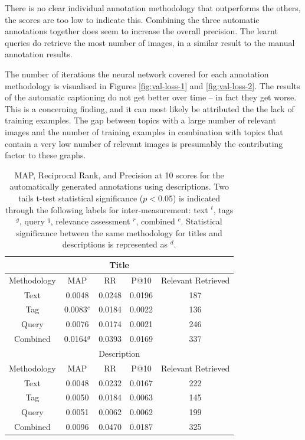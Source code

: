 There is no clear individual annotation methodology that outperforms the others, the scores are too low to indicate this. Combining the three automatic annotations together does seem to increase the overall precision. The learnt queries do retrieve the most number of images, in a similar result to the manual annotation results.

The number of iterations the neural network covered for each annotation methodology is visualised in Figures \ref{fig:val-loss-1} and \ref{fig:val-loss-2}. The results of the automatic captioning do not get better over time -- in fact they get worse. This is a concerning finding, and it can most likely be attributed the the lack of training examples. The gap between topics with a large number of relevant images and the number of training examples in combination with topics that contain a very low number of relevant images is presumably the contributing factor to these graphs.

\begin{table}[ht]
    \centering
    \begin{tabular}{|c|c|c|c|c|}
        \multicolumn{5}{c}{Title}\\ \hline
         Methodology & MAP & RR & P@10 & Relevant Retrieved\\ \hline
         Text & 0.0048 & 0.0248 & 0.0196 & 187 \\ \hline
         Tag & 0.0083$^{c}$ & 0.0184 & 0.0022 & 136 \\ \hline
         Query & 0.0076 & 0.0174 & 0.0021 & 246 \\ \hline
         Combined & 0.0164$^{g}$ & 0.0393 & 0.0169 & 337 \\ \hline
        \multicolumn{5}{c}{Description}\\ \hline
         Methodology & MAP & RR & P@10 & Relevant Retrieved\\ \hline
         Text & 0.0048 & 0.0232 & 0.0167 & 222 \\ \hline
         Tag & 0.0050 & 0.0184 & 0.0063 & 145 \\ \hline
         Query & 0.0051 & 0.0062 & 0.0062 & 199 \\ \hline
         Combined & 0.0096 & 0.0470 & 0.0187 & 325 \\ \hline
    \end{tabular}
    \caption{MAP, Reciprocal Rank, and Precision at 10 scores for the automatically generated annotations using descriptions. Two tails t-test statistical significance ($p<0.05$) is indicated through the following labels for inter-measurement: text $^t$, tags $^g$, query $^q$, relevance assessment $^r$, combined $^c$. Statistical significance between the same methodology for titles and descriptions is represented as $^d$.}
    \label{table:learnt-results}
\end{table}

